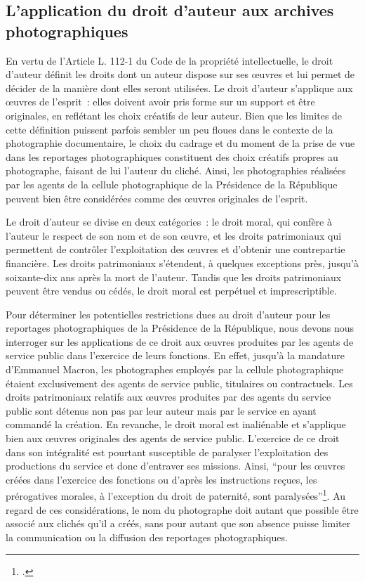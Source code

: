 \subsection*{L'application du droit d'auteur aux archives photographiques}

En vertu de l’Article L. 112-1 du Code de la propriété intellectuelle, le droit d’auteur définit les droits dont un auteur dispose sur ses \oe{}uvres et lui permet de décider de la manière dont elles seront utilisées. Le droit d’auteur s’applique aux \oe{}uvres de l’esprit : elles doivent avoir pris forme sur un support et être originales, en reflétant les choix créatifs de leur auteur. Bien que les limites de cette définition puissent parfois sembler un peu floues dans le contexte de la photographie documentaire, le choix du cadrage et du moment de la prise de vue dans les reportages photographiques constituent des choix créatifs propres au photographe, faisant de lui l'auteur du cliché.  Ainsi, les photographies réalisées par les agents de la cellule photographique de la Présidence de la République peuvent bien être considérées comme des \oe{}uvres originales de l'esprit. 

Le droit d’auteur se divise en deux catégories : le droit moral, qui confère à l’auteur le respect de son nom et de son \oe{}uvre, et les droits patrimoniaux qui permettent de contrôler l’exploitation des \oe{}uvres et d’obtenir une contrepartie financière. Les droits patrimoniaux s’étendent, à quelques exceptions près, jusqu’à soixante-dix ans après la mort de l’auteur. Tandis que les droits patrimoniaux peuvent être vendus ou cédés, le droit moral est perpétuel et imprescriptible.

Pour déterminer les potentielles restrictions dues au droit d'auteur pour les reportages photographiques de la Présidence de la République, nous devons nous interroger sur les applications de ce droit aux \oe{}uvres produites par les agents de service public dans l'exercice de leurs fonctions. En effet, jusqu'à la mandature d'Emmanuel Macron, les photographes employés par la cellule photographique étaient exclusivement des agents de service public, titulaires ou contractuels. Les droits patrimoniaux relatifs aux \oe{}uvres produites par des agents du service public sont détenus non pas par leur auteur mais par le service en ayant commandé la création. En revanche, le droit moral est inaliénable et s'applique bien aux \oe{}uvres originales des agents de service public. L'exercice de ce droit dans son intégralité est pourtant susceptible de paralyser l'exploitation des productions du service et donc d'entraver ses missions. Ainsi, \enquote{pour les \oe{}uvres créées dans l’exercice des fonctions ou d’après les instructions reçues, les prérogatives morales, à l’exception du droit de paternité, sont paralysées}\footcite{touboulDroitsAuteurAgents2011}. Au regard de ces considérations, le nom du photographe doit autant que possible être associé aux clichés qu'il a créés, sans pour autant que son absence puisse limiter la communication ou la diffusion des reportages photographiques. 
\\

